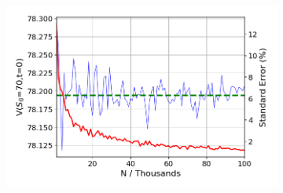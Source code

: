 \documentclass{article}
\begin{document}
\begin{figure}[!h]
\begin{minipage}{.5\textwidth}
\begin{subfigure}{\textwidth}
      \includegraphics[width=\linewidth]{confidence_70_momentmatch.png}
      \label{fig:confidence3}
  \end{subfigure}
\end{minipage}
\begin{minipage}{.5\textwidth}


\end{minipage}
\end{figure}
\end{document}
